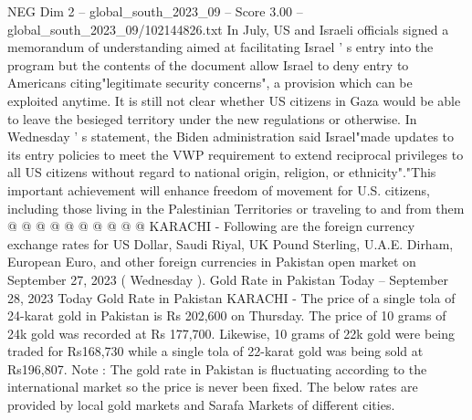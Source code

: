 \begin{textsample}{NEG Dim 2 – global\_south\_2023\_09 – Score 3.00 – global\_south\_2023\_09/102144826.txt}
In July, US and Israeli officials signed a memorandum of understanding aimed at facilitating Israel ' s entry into the program but the contents of the document allow Israel to deny entry to Americans citing"legitimate security concerns", a provision which can be exploited anytime.
It is still not clear whether US citizens in Gaza would be able to leave the besieged territory under the new regulations or otherwise.
In Wednesday ' s statement, the Biden administration said Israel"made updates to its entry policies to meet the VWP requirement to extend reciprocal privileges to all US citizens without regard to national origin, religion, or ethnicity"."This important achievement will enhance freedom of movement for U.S. citizens, including those living in the Palestinian Territories or traveling to and from them @ @ @ @ @ @ @ @ @ @ KARACHI - Following are the foreign currency exchange rates for US Dollar, Saudi Riyal, UK Pound Sterling, U.A.E.
Dirham, European Euro, and other foreign currencies in Pakistan open market on September 27, 2023 ( Wednesday ).
Gold Rate in Pakistan Today -- September 28, 2023 Today Gold Rate in Pakistan KARACHI - The price of a single tola of 24-karat gold in Pakistan is Rs 202,600 on Thursday.
The price of 10 grams of 24k gold was recorded at Rs 177,700.
Likewise, 10 grams of 22k gold were being traded for Rs168,730 while a single tola of 22-karat gold was being sold at Rs196,807.
Note : The gold rate in Pakistan is fluctuating according to the international market so the price is never been fixed.
The below rates are provided by local gold markets and Sarafa Markets of different cities.

\end{textsample}

